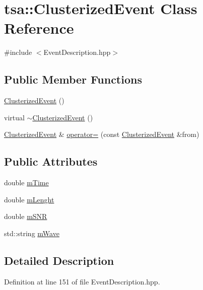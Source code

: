 \hypertarget{classtsa_1_1_clusterized_event}{}\section{tsa\+:\+:Clusterized\+Event Class Reference}
\label{classtsa_1_1_clusterized_event}


{\ttfamily \#include $<$Event\+Description.\+hpp$>$}

\subsection*{Public Member Functions}
\begin{DoxyCompactItemize}
\item 
\hyperlink{classtsa_1_1_clusterized_event_ac94b32f314a2c1ae5618724ea67f5508}{Clusterized\+Event} ()
\item 
virtual \hyperlink{classtsa_1_1_clusterized_event_ab146c7650c0b11d04f201cb56fe8a0c0}{$\sim$\+Clusterized\+Event} ()
\item 
\hyperlink{classtsa_1_1_clusterized_event}{Clusterized\+Event} \& \hyperlink{classtsa_1_1_clusterized_event_ac0dd2efaac85a0995739779c1d093394}{operator=} (const \hyperlink{classtsa_1_1_clusterized_event}{Clusterized\+Event} \&from)
\end{DoxyCompactItemize}
\subsection*{Public Attributes}
\begin{DoxyCompactItemize}
\item 
double \hyperlink{classtsa_1_1_clusterized_event_ad2a8ebd1696cd9d050acfedb57cf194c}{m\+Time}
\item 
double \hyperlink{classtsa_1_1_clusterized_event_a77dc00c177e894b502969f2bd486c2bf}{m\+Lenght}
\item 
double \hyperlink{classtsa_1_1_clusterized_event_a76c2c0a996c70761b5ff0c1ca5c13293}{m\+S\+NR}
\item 
std\+::string \hyperlink{classtsa_1_1_clusterized_event_aa919cc07d7538dc4c90e6bbd2efd7674}{m\+Wave}
\end{DoxyCompactItemize}


\subsection{Detailed Description}


Definition at line 151 of file Event\+Description.\+hpp.



